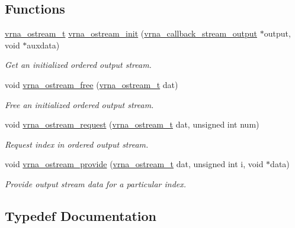 \subsection*{Functions}
\begin{DoxyCompactItemize}
\item 
\hyperlink{group__buffer__utils_ga8da189552af21ab6e4e88bdcc240870c}{vrna\+\_\+ostream\+\_\+t} \hyperlink{group__buffer__utils_gad23113e66a0910ec2341856e2da56bf6}{vrna\+\_\+ostream\+\_\+init} (\hyperlink{group__buffer__utils_ga4adb94338a6f0a1a451e03c1bdac0d9d}{vrna\+\_\+callback\+\_\+stream\+\_\+output} $\ast$output, void $\ast$auxdata)
\begin{DoxyCompactList}\small\item\em Get an initialized ordered output stream. \end{DoxyCompactList}\item 
void \hyperlink{group__buffer__utils_gaf813ec90e1446ba82c89f9a39688a3b3}{vrna\+\_\+ostream\+\_\+free} (\hyperlink{group__buffer__utils_ga8da189552af21ab6e4e88bdcc240870c}{vrna\+\_\+ostream\+\_\+t} dat)
\begin{DoxyCompactList}\small\item\em Free an initialized ordered output stream. \end{DoxyCompactList}\item 
void \hyperlink{group__buffer__utils_gaebca91932705d71bcbf00bd8d82bd7c8}{vrna\+\_\+ostream\+\_\+request} (\hyperlink{group__buffer__utils_ga8da189552af21ab6e4e88bdcc240870c}{vrna\+\_\+ostream\+\_\+t} dat, unsigned int num)
\begin{DoxyCompactList}\small\item\em Request index in ordered output stream. \end{DoxyCompactList}\item 
void \hyperlink{group__buffer__utils_ga6253c42abdeaf3b41a38204865e1f0f7}{vrna\+\_\+ostream\+\_\+provide} (\hyperlink{group__buffer__utils_ga8da189552af21ab6e4e88bdcc240870c}{vrna\+\_\+ostream\+\_\+t} dat, unsigned int i, void $\ast$data)
\begin{DoxyCompactList}\small\item\em Provide output stream data for a particular index. \end{DoxyCompactList}\end{DoxyCompactItemize}


\subsection{Typedef Documentation}
\mbox{\label{group__buffer__utils_ga4adb94338a6f0a1a451e03c1bdac0d9d}} 
